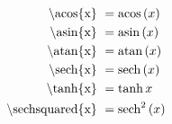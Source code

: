 \begin{subequations}
\begin{align}
\textrm{\textbackslash acos\{x\}         }  & = \textrm{acos} \left( x \right)            \label{eqn:acos} \\
\textrm{\textbackslash asin\{x\}         }  & = \textrm{asin} \left( x \right)            \label{eqn:asin} \\
\textrm{\textbackslash atan\{x\}         }  & = \textrm{atan} \left( x \right)            \label{eqn:atan} \\
\textrm{\textbackslash sech\{x\}         }  & = \textrm{sech} \left( x \right)            \label{eqn:sech} \\
\textrm{\textbackslash tanh\{x\}         }  & = \tanh{x}            \label{eqn:tanh} \\
\textrm{\textbackslash sechsquared\{x\}  }  & = \textrm{sech}^2 \left( x \right)     \label{eqn:sechsquared}
\end{align}
\end{subequations}





















